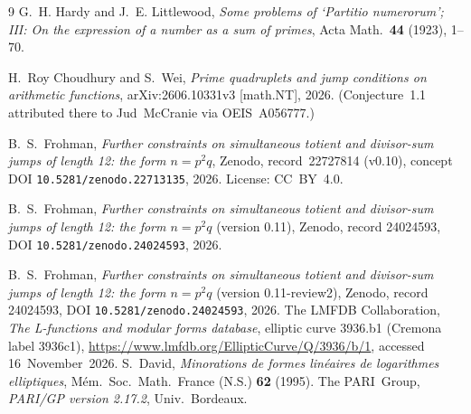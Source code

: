 \documentclass[11pt,reqno]{amsart}
\theoremstyle{definition}
\begin{document}
\begin{thebibliography}{9}
G.~H. Hardy and J.~E. Littlewood,
\textit{Some problems of `Partitio numerorum'; III: On the expression of a number as a sum of primes},
Acta Math.\ \textbf{44} (1923), 1--70.

H.~Roy Choudhury and S.~Wei,
\textit{Prime quadruplets and jump conditions on arithmetic functions},
arXiv:2606.10331v3 [math.NT], 2026.
(Conjecture~1.1 attributed there to Jud~McCranie via OEIS~A056777.)

B.~S.~Frohman,
\textit{Further constraints on simultaneous totient and divisor-sum jumps of length 12: the form \(n=p^2q\)},
Zenodo, record~22727814 (v0.10), concept DOI \texttt{10.5281/zenodo.22713135}, 2026.
License: CC~BY~4.0.

B.~S.~Frohman,
\textit{Further constraints on simultaneous totient and divisor-sum jumps of length 12: the form \(n=p^2q\)} (version 0.11),
Zenodo, record 24024593, DOI \texttt{10.5281/zenodo.24024593}, 2026.

B.~S.~Frohman,
\textit{Further constraints on simultaneous totient and divisor-sum jumps of length 12: the form \(n=p^2q\)} (version 0.11-review2),
Zenodo, record 24024593, DOI \texttt{10.5281/zenodo.24024593}, 2026.
The LMFDB Collaboration, \emph{The L-functions and modular forms database}, elliptic curve 3936.b1 (Cremona label 3936c1), \url{https://www.lmfdb.org/EllipticCurve/Q/3936/b/1}, accessed 16~November~2026.
S.~David, \emph{Minorations de formes lin\'eaires de logarithmes elliptiques}, M\'em.\ Soc.\ Math.\ France (N.S.) \textbf{62} (1995).
The PARI~Group, \emph{PARI/GP version 2.17.2}, Univ.\ Bordeaux.
\end{thebibliography}
\end{document}
